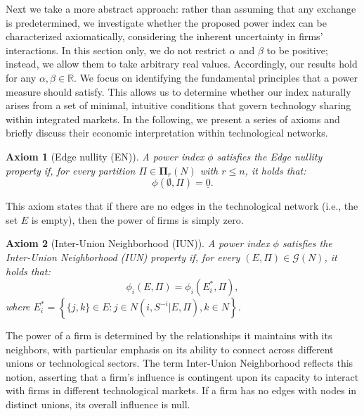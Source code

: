 \documentclass[preprint,11pt,authoryear]{elsarticle}
\theoremstyle{plain}
\newtheorem{axiom}{Axiom}
\begin{document}
Next we take a more abstract approach: rather than assuming that any exchange is predetermined, we investigate whether the proposed power index can be characterized axiomatically, considering the inherent uncertainty in firms' interactions. In this section only, we do not restrict $\alpha$ and $\beta$ to be positive; instead, we allow them to take arbitrary real values. Accordingly, our results hold for any $\alpha, \beta \in \mathbb{R}$.
We focus on identifying the fundamental principles that a power measure should satisfy. This allows us to determine whether our index naturally arises from a set of minimal, intuitive conditions that govern technology sharing within integrated markets. In the following, we present a series of axioms and briefly discuss their economic interpretation within technological networks.
\begin{axiom}[Edge nullity (EN)]\label{Ax-en}
A power index $\phi$ satisfies the \emph{Edge nullity} property if, for every partition 
$\Pi \in \mathbf{\Pi}_r(N)$ with $r \leq n$, it holds that:
\begin{equation*}
    \phi(\emptyset, \Pi) = \underline{0}.
\end{equation*}
\end{axiom}

This axiom states that if there are no edges in the technological network (i.e., the set $E$ is empty), then the power of firms is simply zero.


\begin{axiom}[Inter-Union Neighborhood (IUN)]\label{Ax-ld}
A power index $\phi$ satisfies the \emph{Inter-Union Neighborhood} (IUN) property if, for every $(E,\Pi) \in \mathcal{G}(N)$, it holds that:
\begin{equation*}
    \phi_i(E, \Pi) = \phi_i(E_i^*, \Pi),
\end{equation*}
where $E_i^* = \left\{ \{j, k\} \in E : j \in N(i, S^{-i}|E,\Pi), k \in N \right\}$.
\end{axiom}
The power of a  firm  is determined by the relationships it maintains with its neighbors, with particular emphasis on its ability to connect across different unions or technological sectors. The term Inter-Union Neighborhood reflects this notion, asserting that a firm's influence is contingent upon its capacity to interact with firms in different technological markets. If a firm has no edges with nodes in distinct unions, its overall influence is null. 
\end{document}
